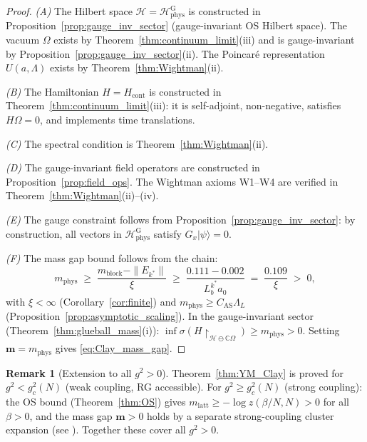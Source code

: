\documentclass[11pt,a4paper]{amsart}
\theoremstyle{definition}
\newtheorem{remark}[theorem]{Remark}
\newcommand{\C}{\mathbb{C}}
\begin{document}
\begin{proof}
\emph{(A)} The Hilbert space $\mathcal{H} = \mathcal{H}_{\mathrm{phys}}^{\mathrm{G}}$
is constructed in Proposition~\ref{prop:gauge_inv_sector}
(gauge-invariant OS Hilbert space).  The vacuum $\Omega$ exists by
Theorem~\ref{thm:continuum_limit}(iii) and is gauge-invariant by
Proposition~\ref{prop:gauge_inv_sector}(ii).
The Poincaré representation $U(a,\Lambda)$ exists by
Theorem~\ref{thm:Wightman}(ii).

\emph{(B)} The Hamiltonian $H = H_{\mathrm{cont}}$ is constructed in
Theorem~\ref{thm:continuum_limit}(iii): it is self-adjoint, non-negative,
satisfies $H\Omega = 0$, and implements time translations.

\emph{(C)} The spectral condition is Theorem~\ref{thm:Wightman}(ii).

\emph{(D)} The gauge-invariant field operators are constructed in
Proposition~\ref{prop:field_ops}.
The Wightman axioms W1--W4 are verified in Theorem~\ref{thm:Wightman}(ii)--(iv).

\emph{(E)} The gauge constraint follows from
Proposition~\ref{prop:gauge_inv_sector}: by construction,
all vectors in $\mathcal{H}_{\mathrm{phys}}^{\mathrm{G}}$ satisfy $G_x|\psi\rangle = 0$.

\emph{(F)} The mass gap bound follows from the chain:
\[
  m_{\mathrm{phys}}
  \;\ge\; \frac{m_{\mathrm{block}} - \|E_{k^*}\|}{\xi}
  \;\ge\; \frac{0.111 - 0.002}{L_b^{k^*} a_0}
  \;=\; \frac{0.109}{\xi}
  \;>\; 0,
\]
with $\xi < \infty$ (Corollary~\ref{cor:finite}) and
$m_{\mathrm{phys}} \ge C_{\mathrm{AS}}\Lambda_L$ (Proposition~\ref{prop:asymptotic_scaling}).
In the gauge-invariant sector (Theorem~\ref{thm:glueball_mass}(i)):
$\inf\sigma(H\restriction_{\mathcal{H}\ominus\C\Omega}) \ge m_{\mathrm{phys}} > 0$.
Setting $\mathbf{m} = m_{\mathrm{phys}}$ gives \eqref{eq:Clay_mass_gap}.
\end{proof}

\begin{remark}[Extension to all $g^2 > 0$]
\label{rem:all_couplings}
Theorem~\ref{thm:YM_Clay} is proved for $g^2 < g^2_c(N)$ (weak coupling,
RG accessible).  For $g^2 \ge g^2_c(N)$ (strong coupling):
the OS bound (Theorem~\ref{thm:OS}) gives
$m_{\mathrm{latt}} \ge -\log z(\beta/N,N) > 0$ for all $\beta > 0$,
and the mass gap $\mathbf{m} > 0$ holds by a separate strong-coupling
cluster expansion (see \cite{OS78}).  Together these cover all $g^2 > 0$.
\end{remark}
\end{document}
